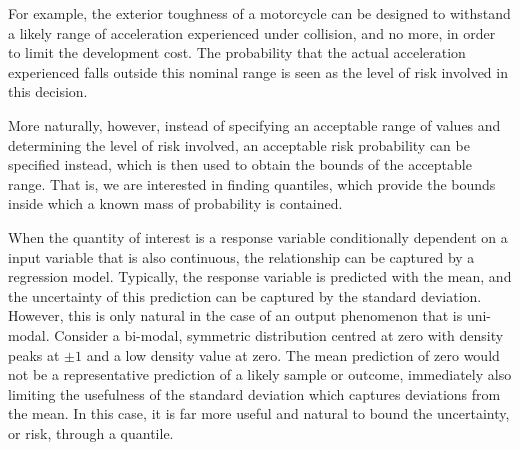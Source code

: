 \documentclass[twoside]{article} \usepackage{aistats2017}
\theoremstyle{definition}
\theoremstyle{theorem}
\begin{document}
	For example, the exterior toughness of a motorcycle can be designed to withstand a likely range of acceleration experienced under collision, and no more, in order to limit the development cost. The probability that the actual acceleration experienced falls outside this nominal range is seen as the level of risk involved in this decision.

	More naturally, however, instead of specifying an acceptable range of values and determining the level of risk involved, an acceptable risk probability can be specified instead, which is then used to obtain the bounds of the acceptable range. That is, we are interested in finding quantiles, which provide the bounds inside which a known mass of probability is contained.
	
	
%
%

	When the quantity of interest is a response variable conditionally dependent on a input variable that is also continuous, the relationship can be captured by a regression model. Typically, the response variable is predicted with the mean, and the uncertainty of this prediction can be captured by the standard deviation. However, this is only natural in the case of an output phenomenon that is uni-modal. Consider a bi-modal, symmetric distribution centred at zero with density peaks at $\pm1$ and a low density value at zero. The mean prediction of zero would not be a representative prediction of a likely sample or outcome, immediately also limiting the usefulness of the standard deviation which captures deviations from the mean. In this case, it is far more useful and natural to bound the uncertainty, or risk, through a quantile.
	
%
%
	
\end{document}
